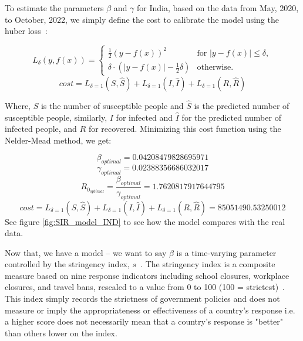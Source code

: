 \documentclass[tikz,fleqn,12pt]{wlscirep}
\begin{document}
To estimate the parameters $\beta$ and $\gamma$ for India, based on the data from May, 2020, to October, 2022, we simply define the cost to calibrate the model using the huber loss~\cite{huberloss}:

\begin{equation}
  L_{\delta}(y, f(x)) = 
  \begin{cases}
    \frac{1}{2}{(y - f(x))^2} & \text{for } |y - f(x)| \leq \delta, \\
    \delta \cdot (|y - f(x)| - \frac{1}{2}\delta) & \text{otherwise.}
  \label{eq:huberloss}
  \end{cases}
\end{equation}
\begin{equation}
  cost = L_{\delta = 1}(S, \hat{S}) + L_{\delta = 1}(I, \hat{I}) + L_{\delta = 1}(R, \hat{R})
  \label{eq:cost_SIR_model}
\end{equation}

Where, $S$ is the number of susceptible people and $\hat{S}$ is the predicted number of susceptible people, similarly, $I$ for infected and $\hat{I}$ for the predicted number of infected people, and $R$ for recovered. Minimizing this cost function using the Nelder-Mead method\cite{Gao2010}, we get:

\begin{equation}
  \beta_{optimal} = 0.04208479828695971
  \label{eq:beta_optimal_without_lockdown}
\end{equation}
\begin{equation}
  \gamma_{optimal} = 0.02388356686032017
  \label{eq:gamma_optimal_without_lockdown}
\end{equation}
\begin{equation}
  R_{0_{optimal}} = \frac{\beta_{optimal}}{\gamma_{optimal}} = 1.7620817917644795
  \label{eq:r0_without_lockdown}
\end{equation}
\begin{equation}
  cost = L_{\delta = 1}(S, \hat{S}) + L_{\delta = 1}(I, \hat{I}) + L_{\delta = 1}(R, \hat{R}) = 85051490.53250012
  \label{eq:cost_without_lockdown}
\end{equation}
See figure \ref{fig:SIR_model_IND} to see how the model compares with the real data.

Now that, we have a model -- we want to say $\beta$ is a time-varying parameter controlled by the stringency index, $s$~\cite{SIRLockdown,SIRLockdown2,analytical_covid_lockdown_model}. The stringency index is a composite measure based on nine response indicators including school closures, workplace closures, and travel bans, rescaled to a value from 0 to 100 (100 = strictest)~\cite{owidcoronavirus}. This index simply records the strictness of government policies and does not measure or imply the appropriateness or effectiveness of a country's response i.e. a higher score does not necessarily mean that a country's response is "better" than others lower on the index. 
\end{document}
